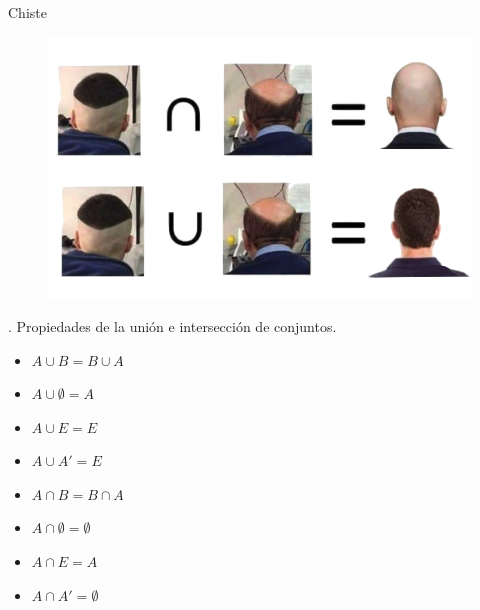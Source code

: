 \begin{myexampleblock}{Chiste}
	\begin{figure}[H]
	\centering
	\includegraphics[width=.9\textwidth]{imagenes/apendices/app10b.png}
	\end{figure}
\end{myexampleblock}

\begin{theorem}
	. Propiedades de la unión e intersección de conjuntos.
		
		\begin{multicols}{2}
		\begin{itemize}
		\vspace{-3mm} \item $A\cup B=B\cup A$
		\vspace{-3mm} \item $A\cup \emptyset=A$
		\vspace{-3mm} \item $A\cup E=E$
		\vspace{-3mm} \item $A\cup A'=E$
		\end{itemize}
		\begin{itemize}
		\vspace{-3mm} \item $A\cap B=B\cap A$
		\vspace{-3mm} \item $A\cap \emptyset=\emptyset$
		\vspace{-3mm} \item $A\cap E=A$
		\vspace{-3mm} \item $A\cap A'=\emptyset$
		\end{itemize}
		\end{multicols}

\end{theorem}

